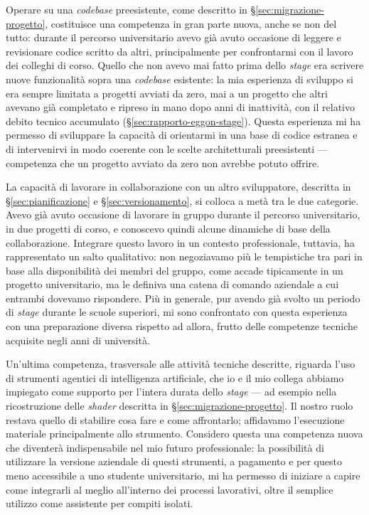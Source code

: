 Operare su una \textit{codebase} preesistente, come descritto in \S\ref{sec:migrazione-progetto}, costituisce una competenza in gran parte nuova, anche se non del tutto: durante il percorso universitario avevo già avuto occasione di leggere e revisionare codice scritto da altri, principalmente per confrontarmi con il lavoro dei colleghi di corso. Quello che non avevo mai fatto prima dello \textit{stage} era scrivere nuove funzionalità sopra una \textit{codebase} esistente: la mia esperienza di sviluppo si era sempre limitata a progetti avviati da zero, mai a un progetto che altri avevano già completato e ripreso in mano dopo anni di inattività, con il relativo debito tecnico accumulato (\S\ref{sec:rapporto-eggon-stage}). Questa esperienza mi ha permesso di sviluppare la capacità di orientarmi in una base di codice estranea e di intervenirvi in modo coerente con le scelte architetturali preesistenti — competenza che un progetto avviato da zero non avrebbe potuto offrire.
 
La capacità di lavorare in collaborazione con un altro sviluppatore, descritta in \S\ref{sec:pianificazione} e \S\ref{sec:versionamento}, si colloca a metà tra le due categorie. Avevo già avuto occasione di lavorare in gruppo durante il percorso universitario, in due progetti di corso, e conoscevo quindi alcune dinamiche di base della collaborazione. Integrare questo lavoro in un contesto professionale, tuttavia, ha rappresentato un salto qualitativo: non negoziavamo più le tempistiche tra pari in base alla disponibilità dei membri del gruppo, come accade tipicamente in un progetto universitario, ma le definiva una catena di comando aziendale a cui entrambi dovevamo rispondere. Più in generale, pur avendo già svolto un periodo di \textit{stage} durante le scuole superiori, mi sono confrontato con questa esperienza con una preparazione diversa rispetto ad allora, frutto delle competenze tecniche acquisite negli anni di università.
 
Un'ultima competenza, trasversale alle attività tecniche descritte, riguarda l'uso di strumenti agentici di intelligenza artificiale, che io e il mio collega abbiamo impiegato come supporto per l'intera durata dello \textit{stage} — ad esempio nella ricostruzione delle \textit{shader} descritta in \S\ref{sec:migrazione-progetto}. Il nostro ruolo restava quello di stabilire cosa fare e come affrontarlo; affidavamo l'esecuzione materiale principalmente allo strumento. Considero questa una competenza nuova che diventerà indispensabile nel mio futuro professionale: la possibilità di utilizzare la versione aziendale di questi strumenti, a pagamento e per questo meno accessibile a uno studente universitario, mi ha permesso di iniziare a capire come integrarli al meglio all'interno dei processi lavorativi, oltre il semplice utilizzo come assistente per compiti isolati.
 
